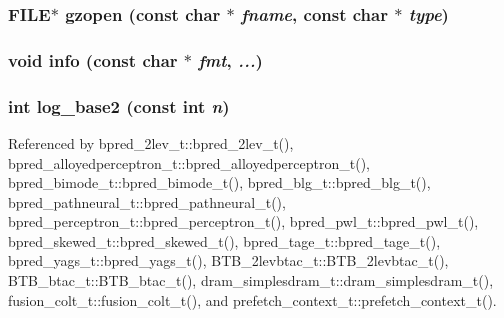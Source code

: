 \subsubsection[{gzopen}]{\setlength{\rightskip}{0pt plus 5cm}FILE$\ast$ gzopen (const char $\ast$ {\em fname}, \/  const char $\ast$ {\em type})}\label{misc_8h_96209036d0579b529d206eb0d958662a}


\subsubsection[{info}]{\setlength{\rightskip}{0pt plus 5cm}void info (const char $\ast$ {\em fmt}, \/   {\em ...})}\label{misc_8h_38dbef7fdf3b2bd9e8f30dae6f948ce8}


\subsubsection[{log\_\-base2}]{\setlength{\rightskip}{0pt plus 5cm}int log\_\-base2 (const int {\em n})}\label{misc_8h_a36cd338e0176d883719b7c69ebc5670}




Referenced by bpred\_\-2lev\_\-t::bpred\_\-2lev\_\-t(), bpred\_\-alloyedperceptron\_\-t::bpred\_\-alloyedperceptron\_\-t(), bpred\_\-bimode\_\-t::bpred\_\-bimode\_\-t(), bpred\_\-blg\_\-t::bpred\_\-blg\_\-t(), bpred\_\-pathneural\_\-t::bpred\_\-pathneural\_\-t(), bpred\_\-perceptron\_\-t::bpred\_\-perceptron\_\-t(), bpred\_\-pwl\_\-t::bpred\_\-pwl\_\-t(), bpred\_\-skewed\_\-t::bpred\_\-skewed\_\-t(), bpred\_\-tage\_\-t::bpred\_\-tage\_\-t(), bpred\_\-yags\_\-t::bpred\_\-yags\_\-t(), BTB\_\-2levbtac\_\-t::BTB\_\-2levbtac\_\-t(), BTB\_\-btac\_\-t::BTB\_\-btac\_\-t(), dram\_\-simplesdram\_\-t::dram\_\-simplesdram\_\-t(), fusion\_\-colt\_\-t::fusion\_\-colt\_\-t(), and prefetch\_\-context\_\-t::prefetch\_\-context\_\-t().

